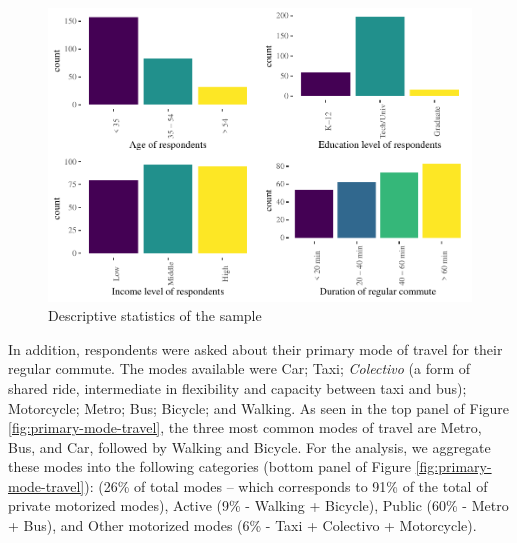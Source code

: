 \documentclass[]{elsarticle} %
\begin{document}
\begin{figure}
\centering
\includegraphics{Dissonance_Santiago_v3_files/figure-latex/plot-descriptive-statistics-1.pdf}
\caption{\label{fig:descriptive-statistics}Descriptive statistics of the
sample}
\end{figure}

In addition, respondents were asked about their primary mode of travel
for their regular commute. The modes available were Car; Taxi;
\emph{Colectivo} (a form of shared ride, intermediate in flexibility and
capacity between taxi and bus); Motorcycle; Metro; Bus; Bicycle; and
Walking. As seen in the top panel of Figure
\ref{fig:primary-mode-travel}, the three most common modes of travel are
Metro, Bus, and Car, followed by Walking and Bicycle. For the analysis,
we aggregate these modes into the following categories (bottom panel of
Figure \ref{fig:primary-mode-travel}): (26\% of total modes -- which
corresponds to 91\% of the total of private motorized modes), Active
(9\% - Walking + Bicycle), Public (60\% - Metro + Bus), and Other
motorized modes (6\% - Taxi + Colectivo + Motorcycle).
\end{document}
